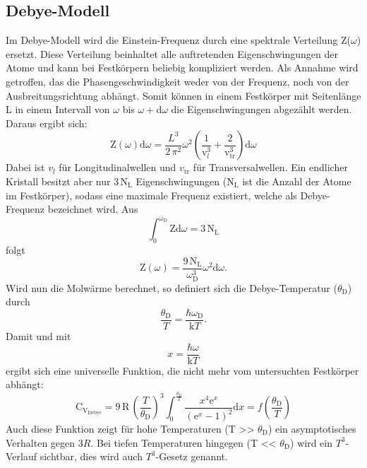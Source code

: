 \subsection{Debye-Modell}
\label{sec:Debye-Modell}
Im Debye-Modell wird die Einstein-Frequenz durch eine spektrale Verteilung Z($\omega$)
ersetzt. Diese Verteilung beinhaltet alle auftretenden Eigenschwingungen der Atome
und kann bei Festkörpern
beliebig kompliziert werden. Als Annahme wird getroffen, das die Phasengeschwindigkeit
weder von der Frequenz, noch von der Ausbreitungsrichtung abhängt. Somit können in
einem Festkörper mit Seitenlänge L in einem Intervall von $\omega$ bis $\omega + \text{d}\omega$
die Eigenschwingungen abgezählt werden. Daraus ergibt sich:
\begin{equation}
  \text{Z}(\omega) \text{d}\omega = \frac{L^3}{2\,\pi^2}\omega^2\left(\frac{1}{\text{v}_l^3}+\frac{2}{\text{v}_\text{tr}^3}\right)\text{d}\omega
\end{equation}
Dabei ist $v_l$ für Longitudinalwellen und $v_\text{tr}$ für Transversalwellen. Ein endlicher Kristall besitzt aber nur $3\,\text{N}_\text{L}$ Eigenschwingungen ($\text{N}_\text{L}$
ist die Anzahl der Atome im Festkörper), sodass eine maximale Frequenz existiert, welche als Debye-Frequenz bezeichnet wird. Aus
\begin{equation}
  \int_0^{\omega_\text{D}} \text{Z} \text{d}\omega = 3\,\text{N}_\text{L}
\end{equation}
folgt
\begin{equation}
  \text{Z}(\omega) = \frac{9\,\text{N}_\text{L}}{\omega_\text{D}^3}\omega^2 \text{d}\omega.
\end{equation}
Wird nun die Molwärme berechnet, so definiert sich die Debye-Temperatur ($\theta_\text{D}$) durch
\begin{equation}
  \frac{\theta_\text{D}}{T} = \frac{\hbar\omega_\text{D}}{\text{k}T}.
\end{equation}
Damit und mit
\begin{equation}
  x = \frac{\hbar\omega}{\text{k}T}
\end{equation}
ergibt sich eine universelle Funktion, die nicht mehr vom untersuchten Festkörper abhängt:
\begin{equation}
  \text{C}_{\text{V}_\text{Debye}} = 9\,\text{R}\,\left(\frac{T}{\theta_\text{D}}\right)^3 \int_0^{\frac{\theta_\text{D}}{T}} \frac{x^4\text{e}^x}{\left(\text{e}^x - 1\right)^2}\text{d}x = f\left(\frac{\theta_\text{D}}{T}\right)
\end{equation}
Auch diese Funktion zeigt für hohe Temperaturen (T >> $\theta_\text{D}$) ein asymptotisches Verhalten gegen 3$R$. Bei tiefen Temperaturen hingegen (T << $\theta_\text{D}$) wird ein
$T^3$-Verlauf sichtbar, dies wird auch $T^3$-Gesetz genannt.

